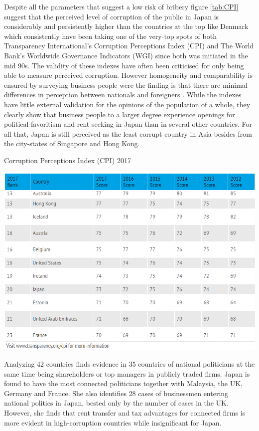 Despite all the parameters that suggest a low risk of bribery \citep{stanley2014business} figure \ref{tab:CPI} suggest that the perceived level of corruption of the public in Japan is considerably and persistently higher than the countries at the top like Denmark which consistently have been taking one of the very-top spots of both Transparency International's Corruption Perceptions Index (CPI) and The World Bank's Worldwide Governance Indicators (WGI) \citep{rohwer2009measuring} since both was initiated in the mid 90s. The validity of these indexes have often been criticised for only being able to measure perceived corruption. However homogeneity and comparability is ensured by surveying business people were the finding is that there are minimal differences in perception between nationals and foreigners \citep{galtung2006measuring}. While the indexes have little external validation for the opinions of the population of a whole, they clearly show that business people to a larger degree experience openings for political favoritism and rent seeking in Japan than in several other countries. For all that, Japan is still perceived as the least corrupt country in Asia besides from the city-states of Singapore and Hong Kong.
\begin{table}[H]
  \centering
    \footnotesize
  \caption{Corruption Perceptions Index (CPI) 2017}
    \includegraphics[width= \textwidth]{04_tables/CPI}
  \label{tab:CPI}
\end{table}\noindent
Analyzing 42 countries \citet{faccio2006politically} finds evidence in 35 countries of national politicians at the same time being shareholders or top managers in publicly traded firms. Japan is found to have the most connected politicians together with Malaysia, the UK, Germany and France. She also identifies 28 cases of businessmen entering national politics in Japan, bested only by the number of cases in the UK. However, she finds that rent transfer and tax advantages for connected firms is more evident in high-corruption countries while insignificant for Japan.


